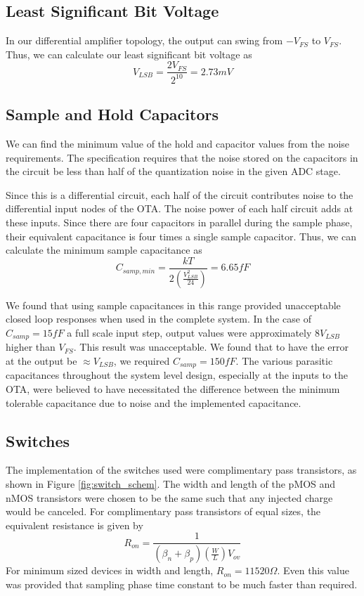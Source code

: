 \documentclass[journal]{IEEEtran}
\begin{document}
\subsection{Least Significant Bit Voltage}
In our differential amplifier topology, the output can swing from $-V_{FS}$ to $V_{FS}$. Thus, we can calculate our least significant bit voltage as
\begin{equation}
V_{LSB}=\frac{2V_{FS}}{2^{10}}=2.73mV
\end{equation}

\subsection{Sample and Hold Capacitors}
We can find the minimum value of the hold and capacitor values from the noise requirements. The specification requires that the noise stored on the capacitors in the circuit be less than half of the quantization noise in the given ADC stage. 

Since this is a differential circuit, each half of the circuit contributes noise to the differential input nodes of the OTA. The noise power of each half circuit adds at these inputs. Since there are four capacitors in parallel during the sample phase, their equivalent capacitance is four times a single sample capacitor. Thus, we can calculate the minimum sample capacitance as
\begin{equation}
C_{samp,min}=\frac{kT}{2\left(\frac{V_{LSB}^2}{24}\right)}=6.65fF
\end{equation}

We found that using sample capacitances in this range provided unacceptable closed loop responses when used in the complete system. In the case of $C_{samp}=15fF$ a full scale input step, output values were approximately $8V_{LSB}$ higher than $V_{FS}$. This result was unacceptable. We found that to have the error at the output be $\approx V_{LSB}$, we required $C_{samp}=150fF$. The various parasitic capacitances throughout the system level design, especially at the inputs to the OTA, were believed to have necessitated the difference between the minimum tolerable capacitance due to noise and the implemented capacitance.

\subsection{Switches}
The implementation of the switches used were complimentary pass transistors, as shown in Figure \ref{fig:switch_schem}. The width and length of the pMOS and nMOS transistors were chosen to be the same such that any injected charge would be canceled. For complimentary pass transistors of equal sizes, the equivalent resistance is given by
\begin{equation}
R_{on} = \frac{1}{\left(\beta_n+\beta_p\right)\left(\frac{W}{L}\right)V_{ov}}
\end{equation}
For minimum sized devices in width and length, $R_{on}=11520\Omega$. Even this value was provided that sampling phase time constant to be much faster than required.
\end{document}
